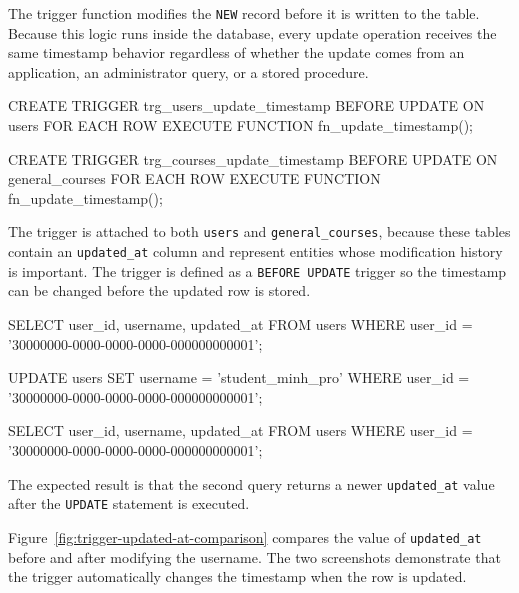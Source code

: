 The trigger function modifies the \texttt{NEW} record before it is written to the table. Because this logic runs inside the database, every update operation receives the same timestamp behavior regardless of whether the update comes from an application, an administrator query, or a stored procedure.

\begin{sqlcode}[caption={Timestamp triggers for users and general courses},label={lst:trigger-update-timestamp-attach}]
CREATE TRIGGER trg_users_update_timestamp
BEFORE UPDATE ON users
FOR EACH ROW
EXECUTE FUNCTION fn_update_timestamp();

CREATE TRIGGER trg_courses_update_timestamp
BEFORE UPDATE ON general_courses
FOR EACH ROW
EXECUTE FUNCTION fn_update_timestamp();
\end{sqlcode}

The trigger is attached to both \texttt{users} and \texttt{general\_courses}, because these tables contain an \texttt{updated\_at} column and represent entities whose modification history is important. The trigger is defined as a \texttt{BEFORE UPDATE} trigger so the timestamp can be changed before the updated row is stored.

\begin{sqlcode}[caption={Testing automatic timestamp update on users},label={lst:test-trigger-update-timestamp}]
SELECT user_id, username, updated_at
FROM users
WHERE user_id = '30000000-0000-0000-0000-000000000001';

UPDATE users
SET username = 'student_minh_pro'
WHERE user_id = '30000000-0000-0000-0000-000000000001';

SELECT user_id, username, updated_at
FROM users
WHERE user_id = '30000000-0000-0000-0000-000000000001';
\end{sqlcode}

The expected result is that the second query returns a newer \texttt{updated\_at} value after the \texttt{UPDATE} statement is executed.

Figure~\ref{fig:trigger-updated-at-comparison} compares the value of \texttt{updated\_at} before and after modifying the username. The two screenshots demonstrate that the trigger automatically changes the timestamp when the row is updated.


